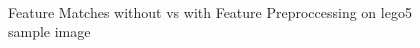 \documentclass[conference,compsoc]{IEEEtran}
\begin{document}
\begin{figure}[ht!]
    \centering
    \\
    \caption{Feature Matches without vs with Feature Preproccessing 
    on lego5 sample image}
    \label{fig:ppc_fmatch}
\end{figure}

\end{document}
